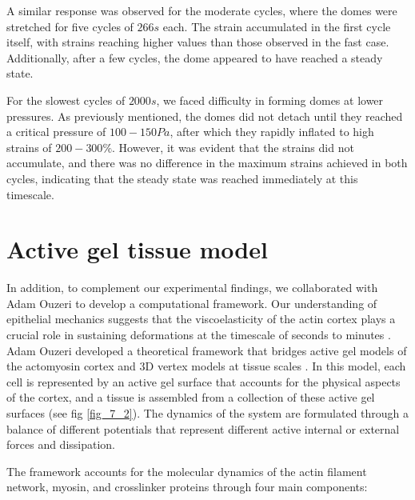 A similar response was observed for the moderate cycles, where the domes were stretched for five cycles of $266 s$ each. The strain accumulated in the first cycle itself, with strains reaching higher values than those observed in the fast case. Additionally, after a few cycles, the dome appeared to have reached a steady state.

For the slowest cycles of $2000 s$, we faced difficulty in forming domes at lower pressures. As previously mentioned, the domes did not detach until they reached a critical pressure of $100-150 Pa$, after which they rapidly inflated to high strains of $200-300\%$. However, it was evident that the strains did not accumulate, and there was no difference in the maximum strains achieved in both cycles, indicating that the steady state was reached immediately at this timescale.

\hypertarget{active-gel-tissue-model}{%
	\section{Active gel tissue model}\label{active-gel-tissue-model}}


In addition, to complement our experimental findings, we collaborated with Adam Ouzeri to develop a computational framework. Our understanding of epithelial mechanics suggests that the viscoelasticity of the actin cortex plays a crucial role in sustaining deformations at the timescale of seconds to minutes \cite{kelkar2020,clement2017,khalilgharibi2019}. Adam Ouzeri developed a theoretical framework that bridges active gel models of the actomyosin cortex and 3D vertex models at tissue scales  \cite{ouzeri2023}. In this model, each cell is represented by an active gel surface that accounts for the physical aspects of the cortex, and a tissue is assembled from a collection of these active gel surfaces (see fig \ref{fig_7_2}). The dynamics of the system are formulated through a balance of different potentials that represent different active internal or external forces and dissipation.

The framework accounts for the molecular dynamics of the actin filament network, myosin, and crosslinker proteins through four main components:

